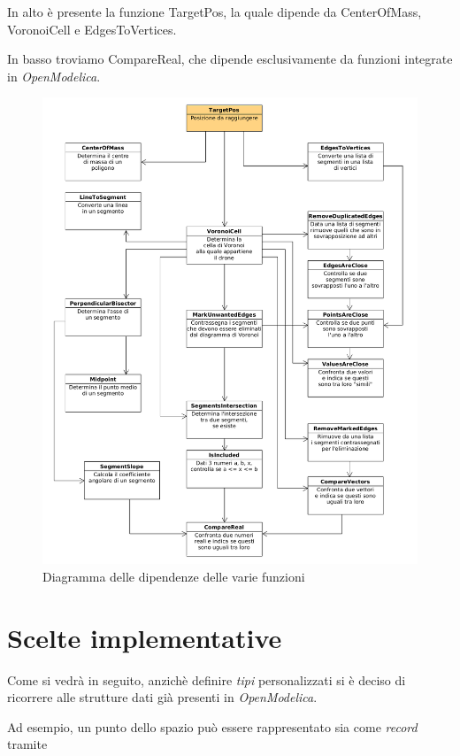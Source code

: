 \documentclass[11pt,a4paper]{report}
\newcommand{\name}[1]{{\ttfamily #1}}
\begin{document}
In alto è presente la funzione \name{TargetPos}, la quale dipende da \name{CenterOfMass}, \name{VoronoiCell} e \name{EdgesToVertices}.

In basso troviamo \name{CompareReal}, che dipende esclusivamente da funzioni integrate in \textit{OpenModelica}.

\begin{figure}[H]
\includegraphics[width=15cm]{uml_diagram/uml_diagram_lloyd.png}
\centering
\caption{Diagramma delle dipendenze delle varie funzioni}
\end{figure}

\section{Scelte implementative}

Come si vedrà in seguito, anzichè definire \textit{tipi} personalizzati si è deciso di ricorrere alle strutture dati già presenti in \textit{OpenModelica}.

Ad esempio, un punto dello spazio può essere rappresentato sia come \textit{record} tramite
\end{document}
